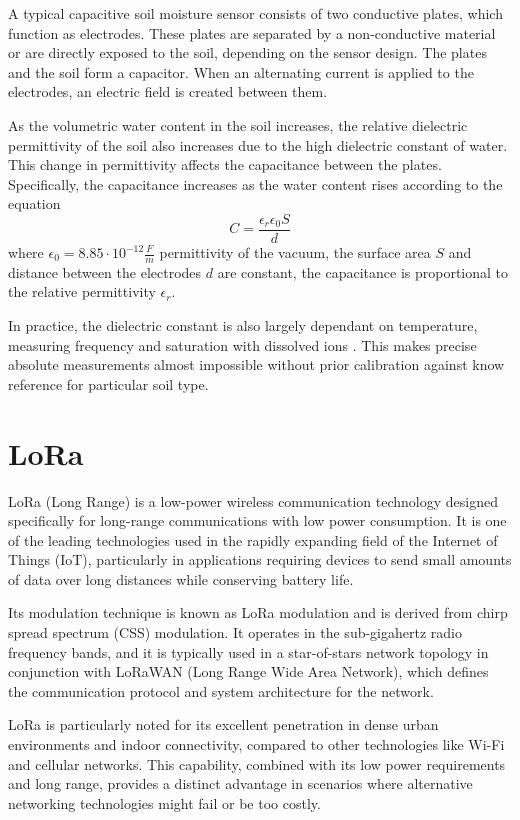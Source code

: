 A typical capacitive soil moisture sensor consists of two conductive plates, which function as electrodes. These plates are separated by a non-conductive material or are directly exposed to the soil, depending on the sensor design. The plates and the soil form a capacitor. When an alternating current is applied to the electrodes, an electric field is created between them.

As the volumetric water content in the soil increases, the relative dielectric permittivity of the soil also increases due to the high dielectric constant of water. This change in permittivity affects the capacitance between the plates. Specifically, the capacitance increases as the water content rises according to the equation
\begin{equation}
    \label{equation:capacitance} C = \dfrac{\epsilon_r \epsilon_0 S}{d}
\end{equation}
where $\epsilon_0 = 8.85 \cdot 10^{-12} \frac{F}{m}$ permittivity of the vacuum, the surface area $S$ and distance between the electrodes $d$ are constant, the capacitance is proportional to the relative permittivity $\epsilon_r$.

In practice, the dielectric constant is also largely dependant on temperature, measuring frequency and saturation with dissolved ions \cite{meter_group_soil_2023,podest_applications_nodate}. This makes precise absolute measurements almost impossible without prior calibration against know reference for particular soil type.

\section{LoRa}
LoRa (Long Range) is a low-power wireless communication technology designed specifically for long-range communications with low power consumption. It is one of the leading technologies used in the rapidly expanding field of the Internet of Things (IoT), particularly in applications requiring devices to send small amounts of data over long distances while conserving battery life.

Its modulation technique is known as LoRa modulation and is derived from chirp spread spectrum (CSS) modulation. It operates in the sub-gigahertz radio frequency bands, and it is typically used in a star-of-stars network topology in conjunction with LoRaWAN (Long Range Wide Area Network), which defines the communication protocol and system architecture for the network.

LoRa is particularly noted for its excellent penetration in dense urban environments and indoor connectivity, compared to other technologies like Wi-Fi and cellular networks. This capability, combined with its low power requirements and long range, provides a distinct advantage in scenarios where alternative networking technologies might fail or be too costly.
